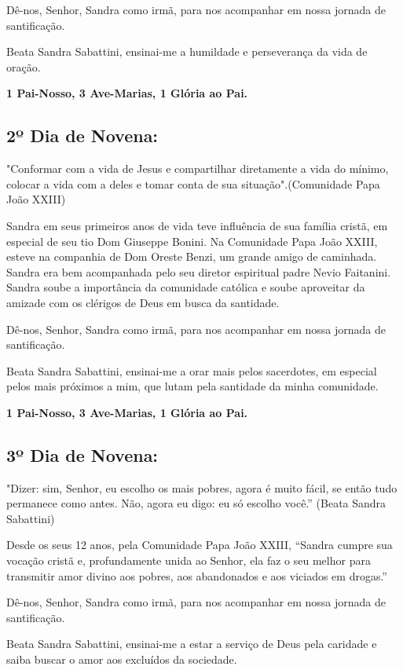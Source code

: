 \documentclass[a4paper,14pt]{extarticle} \usepackage[utf8]{inputenc}
\begin{document}
Dê-nos, Senhor, Sandra como irmã, para nos acompanhar em nossa jornada de santificação.

Beata Sandra Sabattini, ensinai-me a humildade e perseverança da vida de oração.


\textbf{\textbf{1 Pai-Nosso, 3 Ave-Marias,  1 Glória ao Pai.}}


\subsection{2º Dia de Novena:} "Conformar com a vida de Jesus e compartilhar diretamente a vida do mínimo, colocar a vida com a deles e tomar conta de sua situação".(Comunidade Papa João XXIII)

Sandra em seus primeiros anos de vida teve influência de sua família cristã, em especial de seu tio Dom Giuseppe Bonini. Na Comunidade Papa João XXIII, esteve na companhia de Dom Oreste Benzi, um grande amigo de caminhada. Sandra era bem acompanhada pelo seu diretor espiritual padre Nevio Faitanini. Sandra soube a importância da comunidade católica e soube aproveitar da amizade com os clérigos de Deus em busca da santidade.


Dê-nos, Senhor, Sandra como irmã, para nos acompanhar em nossa jornada de santificação.


Beata Sandra Sabattini, ensinai-me a orar mais pelos sacerdotes, em especial pelos mais próximos a mim, que lutam pela santidade da minha comunidade.


\textbf{1 Pai-Nosso, 3 Ave-Marias,  1 Glória ao Pai.}


\subsection{3º Dia de Novena:} "Dizer: sim, Senhor, eu escolho os mais pobres, agora é muito fácil, se então tudo permanece como antes. Não, agora eu digo: eu só escolho você.” (Beata Sandra Sabattini)

Desde os seus 12 anos, pela Comunidade Papa João XXIII, “Sandra cumpre sua vocação cristã e, profundamente unida ao Senhor, ela faz o seu melhor para transmitir amor divino aos pobres, aos abandonados e aos viciados em drogas.” 


Dê-nos, Senhor, Sandra como irmã, para nos acompanhar em nossa jornada de santificação.


Beata Sandra Sabattini, ensinai-me a estar a serviço de Deus pela caridade e saiba buscar o amor aos excluídos da sociedade.
\end{document}
